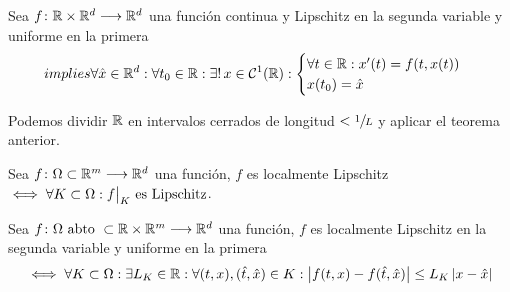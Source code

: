 \begin{cor}
	Sea $f \colon \mathbb{R}\times \mathbb{R}^d \longrightarrow \mathbb{R}^d$ una función continua y Lipschitz en la segunda variable y uniforme en la primera
	\[implies \forall \hat{x} \in \mathbb{R}^d : \forall t_0 \in \mathbb{R} : \exists! \, x \in \mathcal{C}^1(\mathbb{R}) : \begin{cases}
			\forall t \in \mathbb{R} : x'(t) = f(t, x(t)) \\
			x(t_0) = \hat{x}
		\end{cases}\]
	\begin{dem}
		Podemos dividir $\mathbb{R}$ en intervalos cerrados de longitud $<\sfrac{1}{L}$ y aplicar el teorema anterior.
	\end{dem}
\end{cor}

\begin{defn}
	Sea $f \colon \Omega \subset \mathbb{R}^m \longrightarrow \mathbb{R}^d$ una función, $f$ es localmente Lipschitz $\iff \forall K \subset \Omega : \big.f\big|_K \text{ es Lipschitz}$.
\end{defn}
\begin{defn}
	Sea $f \colon \Omega \text{ abto }\subset \mathbb{R} \times \mathbb{R}^m \longrightarrow \mathbb{R}^d$ una función, $f$ es localmente Lipschitz en la segunda variable y uniforme en la primera
	\[\iff \forall K \subset \Omega : \exists L_K \in \mathbb{R} : \forall (t, x), (\hat{t}, \hat{x}) \in K : \left|f(t, x) - f(\hat{t}, \hat{x})\right| \leq L_K \left|x-\hat{x}\right|\]
\end{defn}
